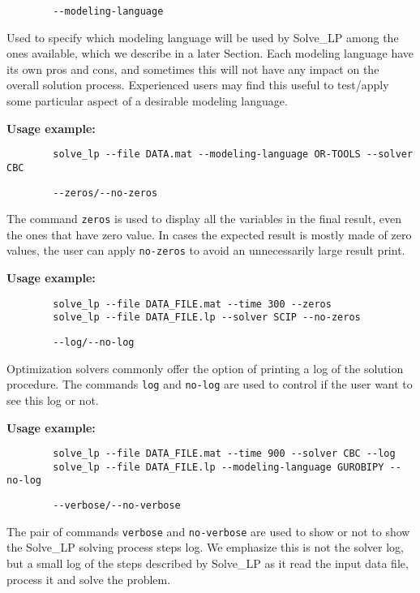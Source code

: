 \documentclass[12pt,hidelinks]{article}
\begin{document}
	{\color{mordantred19}
	\begin{verbatim}
		--modeling-language
	\end{verbatim}
	} Used to specify which modeling language will be used by Solve\_LP among the ones available, which we describe in a later Section. Each modeling language have its own pros and cons, and sometimes this will not have any impact on the overall solution process. Experienced users may find this useful to test/apply some particular aspect of a desirable modeling language.
	
	\textbf{Usage example:} 
	\begin{verbatim}
		solve_lp --file DATA.mat --modeling-language OR-TOOLS --solver CBC
	\end{verbatim}

	{\color{mordantred19}
	\begin{verbatim}
		--zeros/--no-zeros
	\end{verbatim}
	} The command \texttt{zeros} is used to display all the variables in the final result, even the ones that have zero value. In cases the expected result is mostly made of zero values, the user can apply \texttt{no-zeros} to avoid an unnecessarily large result print.
	
	\textbf{Usage example:} 
	\begin{verbatim}
		solve_lp --file DATA_FILE.mat --time 300 --zeros
		solve_lp --file DATA_FILE.lp --solver SCIP --no-zeros
	\end{verbatim}

	{\color{mordantred19}
	\begin{verbatim}
		--log/--no-log
	\end{verbatim}
	} Optimization solvers commonly offer the option of printing a log of the solution procedure. The commands \texttt{log} and \texttt{no-log} are used to control if the user want to see this log or not.
	
	\textbf{Usage example:} 
	\begin{verbatim}
		solve_lp --file DATA_FILE.mat --time 900 --solver CBC --log
		solve_lp --file DATA_FILE.lp --modeling-language GUROBIPY --no-log
	\end{verbatim}

	{\color{mordantred19}
	\begin{verbatim}
		--verbose/--no-verbose
	\end{verbatim}
	} The pair of commands \texttt{verbose} and \texttt{no-verbose} are used to show or not to show the Solve\_LP solving process steps log. We emphasize this is not the solver log, but a small log of the steps described by Solve\_LP as it read the input data file, process it and solve the problem.
	
\end{document}
